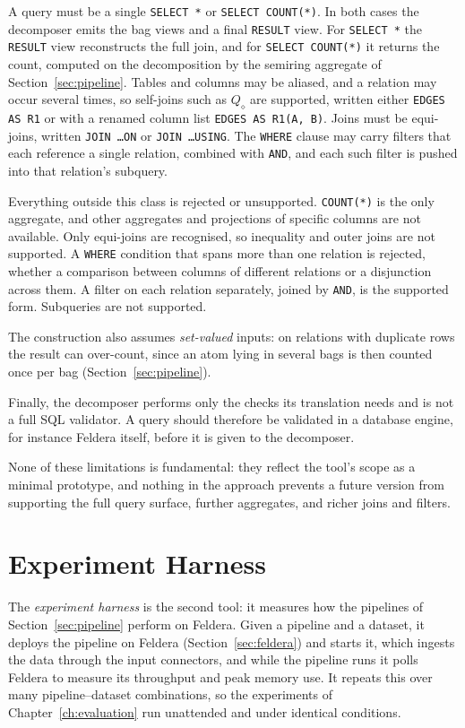 A query must be a single \texttt{SELECT *} or \texttt{SELECT COUNT(*)}.
In both cases the decomposer emits the bag views and a final \texttt{RESULT} view.
For \texttt{SELECT *} the \texttt{RESULT} view reconstructs the full join, and for \texttt{SELECT COUNT(*)} it returns the count, computed on the decomposition by the semiring aggregate of Section~\ref{sec:pipeline}.
Tables and columns may be aliased, and a relation may occur several times, so self-joins such as $Q_\diamond$ are supported, written either \texttt{EDGES AS R1} or with a renamed column list \texttt{EDGES AS R1(A, B)}.
Joins must be equi-joins, written \texttt{JOIN \ldots ON} or \texttt{JOIN \ldots USING}.
The \texttt{WHERE} clause may carry filters that each reference a single relation, combined with \texttt{AND}, and each such filter is pushed into that relation's subquery.

\medskip

Everything outside this class is rejected or unsupported.
\texttt{COUNT(*)} is the only aggregate, and other aggregates and projections of specific columns are not available.
Only equi-joins are recognised, so inequality and outer joins are not supported.
A \texttt{WHERE} condition that spans more than one relation is rejected, whether a comparison between columns of different relations or a disjunction across them.
A filter on each relation separately, joined by \texttt{AND}, is the supported form.
Subqueries are not supported.

The construction also assumes \emph{set-valued} inputs: on relations with duplicate rows the result can over-count, since an atom lying in several bags is then counted once per bag (Section~\ref{sec:pipeline}).

Finally, the decomposer performs only the checks its translation needs and is not a full SQL validator.
A query should therefore be validated in a database engine, for instance Feldera itself, before it is given to the decomposer.

None of these limitations is fundamental: they reflect the tool's scope as a minimal prototype, and nothing in the approach prevents a future version from supporting the full query surface, further aggregates, and richer joins and filters.

\section{Experiment Harness}
\label{sec:harness}

The \emph{experiment harness} is the second tool: it measures how the pipelines of Section~\ref{sec:pipeline} perform on Feldera.
Given a pipeline and a dataset, it deploys the pipeline on Feldera (Section~\ref{sec:feldera}) and starts it, which ingests the data through the input connectors, and while the pipeline runs it polls Feldera to measure its throughput and peak memory use.
It repeats this over many pipeline--dataset combinations, so the experiments of Chapter~\ref{ch:evaluation} run unattended and under identical conditions.

